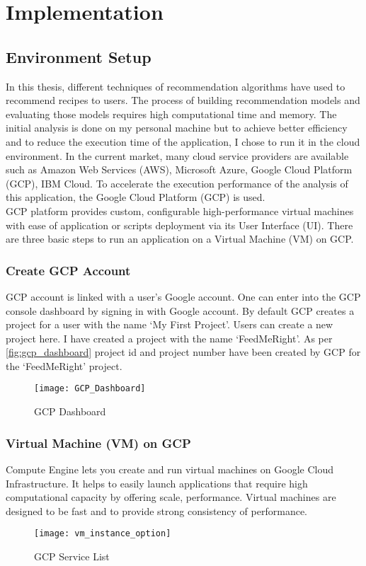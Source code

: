 \chapter{Implementation}
\label{ch:impl}
\section{Environment Setup}
In this thesis, different techniques of recommendation algorithms have used to recommend recipes to users. The process of building recommendation models and evaluating those models requires high computational time and memory. The initial analysis is done on my personal machine but to achieve better efficiency and to reduce the execution time of the application, I chose to run it in the cloud environment.  In the current market, many cloud service providers are available such as Amazon Web Services (AWS), Microsoft Azure, Google Cloud Platform (GCP), IBM Cloud. To accelerate the execution performance of the analysis of this application, the Google Cloud Platform (GCP) is used. \\
\noindent GCP platform provides custom, configurable high-performance virtual machines with ease of application or scripts deployment via its User Interface (UI). There are three basic steps to run an application on a Virtual Machine (VM) on GCP. 
\subsection{Create GCP Account}
GCP account is linked with a user's Google account. One can enter into the GCP console dashboard by signing in with Google account. By default GCP creates a project for a user with the name `My First Project'. Users can create a new project here. I have created a project with the name `FeedMeRight'. As per \autoref{fig:gcp_dashboard} project id and project number have been created by GCP for the `FeedMeRight' project. 
\begin{figure}[H]
	\centering
	\texttt{[image: GCP\_Dashboard]}
	\caption{GCP Dashboard}
	\label{fig:gcp_dashboard}
\end{figure}
  
\subsection{Virtual Machine (VM) on GCP}
Compute Engine lets you create and run virtual machines on Google Cloud Infrastructure. It helps to easily launch applications that require high computational capacity by offering scale, performance. Virtual machines are designed to be fast and to provide strong consistency of performance. 
\begin{figure}[H]
	\centering
	\texttt{[image: vm\_instance\_option]}
	\caption{GCP Service List}
	\label{fig:vm_instance_option}
\end{figure}

